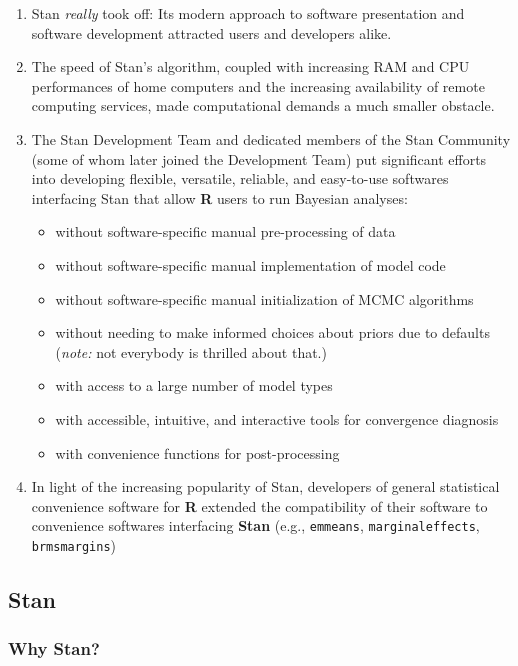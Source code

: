 \documentclass[
  11pt,
]{article}
\providecommand{\tightlist}{%
  \setlength{\itemsep}{0pt}\setlength{\parskip}{0pt}}
\begin{document}
\begin{enumerate}
\def\labelenumi{\arabic{enumi}.}
\tightlist
\item
  Stan \emph{really} took off: Its modern approach to software presentation and software development attracted users and developers alike.
\item
  The speed of Stan's algorithm, coupled with increasing RAM and CPU performances of home computers and the increasing availability of remote computing services, made computational demands a much smaller obstacle.
\item
  The Stan Development Team and dedicated members of the Stan Community (some of whom later joined the Development Team) put significant efforts into developing flexible, versatile, reliable, and easy-to-use softwares interfacing Stan that allow \textbf{R} users to run Bayesian analyses:

  \begin{itemize}
  \tightlist
  \item
    without software-specific manual pre-processing of data
  \item
    without software-specific manual implementation of model code
  \item
    without software-specific manual initialization of MCMC algorithms
  \item
    without needing to make informed choices about priors due to defaults (\emph{note:} not everybody is thrilled about that.)
  \item
    with access to a large number of model types
  \item
    with accessible, intuitive, and interactive tools for convergence diagnosis
  \item
    with convenience functions for post-processing
  \end{itemize}
\item
  In light of the increasing popularity of Stan, developers of general statistical convenience software for \textbf{R} extended the compatibility of their software to convenience softwares interfacing \textbf{Stan} (e.g., \texttt{emmeans}, \texttt{marginaleffects}, \texttt{brmsmargins})
\end{enumerate}

\hypertarget{stan}{%
\subsection{Stan}\label{stan}}

\hypertarget{why-stan}{%
\subsubsection{Why Stan?}\label{why-stan}}
\end{document}

